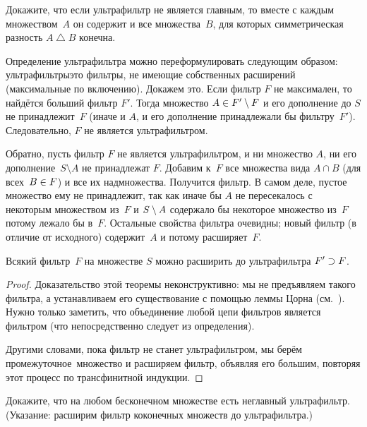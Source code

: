 \begin{problem}
        \label{finite-invariant}%
Докажите, что если ультрафильтр не является главным, то вместе
с каждым множеством~$A$ он содержит и все множества~$B$, для
которых симметрическая разность $A\bigtriangleup B$ конечна.
\end{problem}

Определение ультрафильтра можно переформулировать следующим
образом: ультрафильтры\т это фильтры, не имеющие собственных
расширений (максимальные по включению). Докажем это. Если фильтр
$F$ не максимален, то найдётся больший фильтр $F'$. Тогда
множество $A\hm\in F'\setminus F$ и его дополнение до $S$ не
принадлежит~$F$ (иначе и $A$, и его дополнение принадлежали бы
фильтру~$F'$). Следовательно, $F$ не является ульт\-ра\-фильтром.

Обратно, пусть фильтр $F$ не является ультрафильтром, и ни
множество $A$, ни его дополнение~$S\setminus A$ не принадлежат
$F$. Добавим к~$F$ все множества вида $A\cap B$ (для
всех~$B\hm\in F$) и все их надмножества. Получится фильтр. В
самом деле, пустое множество ему не принадлежит, так как иначе
бы $A$ не пересекалось с некоторым множеством из~$F$ и
$S\hm\setminus A$ содержало бы некоторое множество из~$F$ потому
лежало бы в~$F$. Остальные свойства фильтра очевидны; новый
фильтр (в отличие от исходного) содержит~$A$ и потому
расширяет~$F$.

\begin{theorem}
        \label{filter-ultrafilter}%
Всякий фильтр~$F$  на множестве $S$ можно расширить до ультрафильтра
$F'\hm\supset F$.
\end{theorem}

\begin{proof}
Доказательство этой теоремы неконструктивно: мы не предъявляем
такого фильтра, а устанавливаем его существование с помощью
леммы Цорна%
%
(см.~\cite{naive-set-theory}).
Нужно только заметить, что объединение любой цепи фильтров
является фильтром (что непосредственно следует из определения).

Другими словами, пока фильтр не станет ультрафильтром, мы берём
 промежуточное\ множество и расширяем фильтр, объявляя его
большим, повторяя этот процесс по трансфинитной индукции.
\end{proof}

\begin{problem}
Докажите, что на любом бесконечном множестве есть неглавный
ультрафильтр. (Указание: расширим фильтр коконечных множеств до
ультрафильтра.)
\end{problem}

